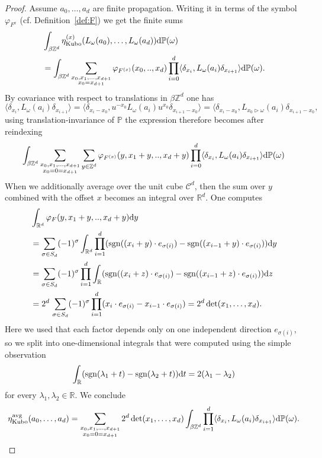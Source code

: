 \documentclass[12pt]{amsart}
\newcommand{\RM}{{\mathbb R}}
\newcommand{\ZM}{{\mathbb Z}}
\newcommand{\PM}{{\mathbb P}}
\newcommand{\Cc}{{\mathcal C}}
\newcommand{\sgn}{{\rm sgn}}
\newcommand{\difd}{\textup{d}}
\begin{document}
\begin{proof}
Assume $a_0,\ldots,a_d$ are finite propagation. Writing it in terms of the symbol $\varphi_{F^{x}}$ (cf. Definition~\ref{def:F}) we get the finite sums
\begin{align*}
&\int_{\beta\ZM^d} \eta^{(x)}_{\mathrm{Kubo}}(L_\omega(a_0),\dots,L_\omega(a_d))\difd\PM(\omega) \\
&=\int_{\beta\ZM^d} \sum_{\substack{x_0,x_1,\dots,x_{d+1}\\ x_0=x_{d+1}}} \varphi_{F^{(x)}}(x_0,..,x_d) \prod_{i=0}^d\langle\delta_{x_i}, L_\omega(a_i)  \delta_{x_{i+1}}\rangle\difd\PM(\omega).
\end{align*}
By covariance with respect to translations in $\beta\ZM^d$ one has $$\langle\delta_{x_i}, L_\omega(a_i)  \delta_{x_{i+1}}\rangle=\langle\delta_{x_i-x_0}, u^{-x_0}L_\omega(a_i) u^{x_0} \delta_{x_{i+1}-x_0}\rangle=\langle\delta_{x_i-x_0}, L_{x_0\triangleright \omega}(a_i) \delta_{x_{i+1}-x_0},$$
using translation-invariance of $\PM$ the expression therefore becomes after reindexing
$$
\int_{\beta\ZM^d} \sum_{\substack{x_0,x_1,\dots,x_{d+1}\\ x_0=0=x_{d+1}}} \sum_{y\in \ZM^d}\varphi_{F^{(x)}}(y,x_1+y,..,x_d+y) \prod_{i=0}^d\langle\delta_{x_i}, L_\omega(a_i) \delta_{x_{i+1}}\rangle\difd\PM(\omega)$$
When we additionally average over the unit cube $\Cc^d$, then the sum over $y$ combined with the offset $x$ becomes an integral over $\RM^d$. One computes
\begin{align*}
&\int_{\RM^d}\varphi_{F}(y,x_1+y,..,x_d+y)\mathrm{d}y\\
&=\sum_{\sigma \in S_d} (-1)^{\sigma} \int_{\RM^d} \prod_{i=1}^d (\sgn((x_{i}+y)\cdot e_{\sigma(i)}) - \sgn((x_{i-1}+y)\cdot e_{\sigma(i)}))\difd{y} \\
&=\sum_{\sigma \in S_d} (-1)^{\sigma} \prod_{i=1}^d \int_{\RM} (\sgn((x_{i}+z)\cdot e_{\sigma(i)}) - \sgn((x_{i-1}+z)\cdot e_{\sigma(i)}))\difd{z}\\
&= 2^d \, \sum_{\sigma \in S_d} (-1)^{\sigma} \prod_{i=1}^d  (x_{i} \cdot e_{\sigma(i)} - x_{i-1} \cdot e_{\sigma(i)})= 2^d\, \mathrm{det}(x_1,\dots,x_d).
\end{align*}
Here we used that each factor depends only on one independent direction $e_{\sigma(i)}$, so we split into one-dimensional integrals that were computed using the simple observation 
$$\int_\RM (\sgn(\lambda_1+t)-\sgn(\lambda_2+t))\difd t = 2 (\lambda_1-\lambda_2)$$
for every $\lambda_1,\lambda_2 \in \RM$. We conclude
$$\eta^{\mathrm{avg}}_{\mathrm{Kubo}}(a_0,\dots,a_d) = \sum_{\substack{x_0,x_1,\dots,x_{d+1}\\ x_0=0=x_{d+1}}} 2^d \det(x_1,\ldots,x_d) \int_{\beta\ZM^d}\prod_{i=1}^d\langle\delta_{x_i}, L_\omega(a_i)\delta_{x_{i+1}}\rangle\difd\PM(\omega).$$


\end{proof}
\end{document}
